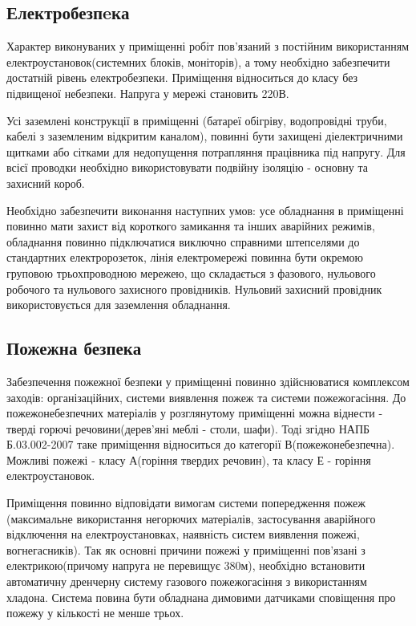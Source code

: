 \subsection{Електробезпeка}
    Характер виконуваних у приміщенні робіт пов'язаний з постійним використанням електроустановок(системних блоків, моніторів), а тому необхідно забезпечити
    достатній рівень електробезпеки. Приміщення відноситься до класу без підвищеної небезпеки. Напруга у мережі становить 220В.

    Усі заземлені конструкції в приміщенні (батареї обігріву, водопровідні труби, кабелі з заземленим відкритим каналом),
    повинні бути захищені діелектричними щитками або сітками для недопущення потрапляння працівника під напругу. Для всієї проводки необхідно використовувати
    подвійну ізоляцію - основну та захисний короб.

    Необхідно забезпечити виконання наступних умов: усе обладнання в приміщенні повинно мати захист від короткого замикання та інших аварійних режимів,
    обладнання повинно підключатися виключно справними штепселями до стандартних електророзеток, лінія електромережі повинна бути окремою груповою трьохпроводною мережею, що складається
    з фазового, нульового робочого та нульового захисного провідників. Нульовий захисний провідник використовується для заземлення обладнання.


    \subsection{Пожежна безпека}
    Забезпечення пожежної безпеки у приміщенні повинно здійснюватися комплексом заходів: організаційних, системи виявлення пожеж та системи пожежогасіння.
    До пожежонебезпечних матеріалів у розглянутому приміщенні можна віднести - тверді горючі речовини(дерев'яні меблі - столи, шафи).
    Тоді згідно НАПБ Б.03.002-2007\cite{lab-napb} таке приміщення відноситься до категорії В(пожежонебезпечна).  Можливі пожежі - класу А(горіння твердих речовин), та класу Е - горіння електроустановок.

Приміщення повинно відповідати вимогам системи попередження пожеж (максимальне використання негорючих матеріалів, застосування аварійного відключення
на електроустановках, наявність систем виявлення пожежі, вогнегасників).
Так як основні причини пожежі у приміщенні пов'язані з електрикою(причому напруга не перевищує 380м), необхідно встановити автоматичну
дренчерну систему газового пожежогасіння з використанням хладона. Система повина бути обладнана димовими датчиками сповіщення про пожежу у кількості
не менше трьох.

